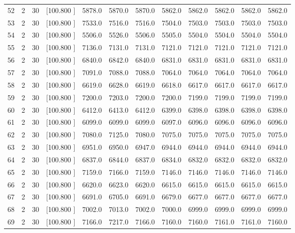 \documentclass[12pt,a4paper]{article}
\begin{document}
\begin{center}
{\begin{tabular}{r r r r r r r r r r r r}
  52&  2& 30&[100.800   ]&  5878.0&  5870.0&  5870.0&  5862.0&  5862.0&  5862.0&  5862.0&  5862.0\\[-0.02in]
  53&  2& 30&[100.800   ]&  7533.0&  7516.0&  7516.0&  7504.0&  7503.0&  7503.0&  7503.0&  7503.0\\[-0.02in]
  54&  2& 30&[100.800   ]&  5506.0&  5526.0&  5506.0&  5505.0&  5504.0&  5504.0&  5504.0&  5504.0\\[-0.02in]
  55&  2& 30&[100.800   ]&  7136.0&  7131.0&  7131.0&  7121.0&  7121.0&  7121.0&  7121.0&  7121.0\\[-0.02in]
  56&  2& 30&[100.800   ]&  6840.0&  6842.0&  6840.0&  6831.0&  6831.0&  6831.0&  6831.0&  6831.0\\[-0.02in]
  57&  2& 30&[100.800   ]&  7091.0&  7088.0&  7088.0&  7064.0&  7064.0&  7064.0&  7064.0&  7064.0\\[-0.02in]
  58&  2& 30&[100.800   ]&  6619.0&  6628.0&  6619.0&  6618.0&  6617.0&  6617.0&  6617.0&  6617.0\\[-0.02in]
  59&  2& 30&[100.800   ]&  7200.0&  7203.0&  7200.0&  7200.0&  7199.0&  7199.0&  7199.0&  7199.0\\[-0.02in]
  60&  2& 30&[100.800   ]&  6412.0&  6413.0&  6412.0&  6399.0&  6398.0&  6398.0&  6398.0&  6398.0\\[-0.02in]
  61&  2& 30&[100.800   ]&  6099.0&  6099.0&  6099.0&  6097.0&  6096.0&  6096.0&  6096.0&  6096.0\\[-0.02in]
  62&  2& 30&[100.800   ]&  7080.0&  7125.0&  7080.0&  7075.0&  7075.0&  7075.0&  7075.0&  7075.0\\[-0.02in]
  63&  2& 30&[100.800   ]&  6951.0&  6950.0&  6947.0&  6944.0&  6944.0&  6944.0&  6944.0&  6944.0\\[-0.02in]
  64&  2& 30&[100.800   ]&  6837.0&  6844.0&  6837.0&  6834.0&  6832.0&  6832.0&  6832.0&  6832.0\\[-0.02in]
  65&  2& 30&[100.800   ]&  7159.0&  7166.0&  7159.0&  7146.0&  7146.0&  7146.0&  7146.0&  7146.0\\[-0.02in]
  66&  2& 30&[100.800   ]&  6620.0&  6623.0&  6620.0&  6615.0&  6615.0&  6615.0&  6615.0&  6615.0\\[-0.02in]
  67&  2& 30&[100.800   ]&  6691.0&  6705.0&  6691.0&  6679.0&  6677.0&  6677.0&  6677.0&  6677.0\\[-0.02in]
  68&  2& 30&[100.800   ]&  7002.0&  7013.0&  7002.0&  7000.0&  6999.0&  6999.0&  6999.0&  6999.0\\[-0.02in]
  69&  2& 30&[100.800   ]&  7166.0&  7217.0&  7166.0&  7160.0&  7160.0&  7161.0&  7161.0&  7160.0\\[-0.02in]

\end{tabular}}
\end{center}
\end{document}
